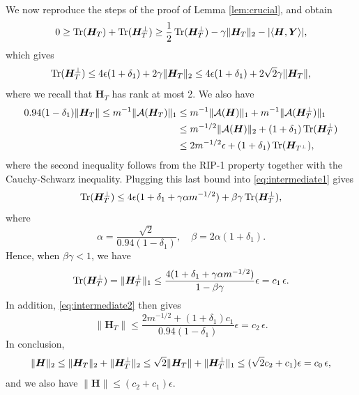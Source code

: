 \documentclass[11pt]{article}
\newcommand{\<}{\langle}
\renewcommand{\>}{\rangle}
\newcommand{\bH}{\bm{H}}
\newcommand{\bY}{\bm{Y}}
\newcommand{\tr}{\operatorname{Tr}}
\numberwithin{equation}{section}
\newcommand{\cA}{\mathcal{A}}
\begin{document}
We now reproduce the steps of the proof of Lemma \ref{lem:crucial},
and obtain
\[
0 \ge \tr(\bH_T) + \tr(\bH_\Tp) \ge \frac12 \tr(\bH_\Tp) - \gamma \|\bH_T\|_2
- |\<\bH,\bY\>|, 
\]
which gives 
\begin{equation}
  \label{eq:intermediate1}
  \tr(\bH_\Tp) \le 4\epsilon(1+\delta_1) + 2\gamma \|\bH_T\|_2 \le
4\epsilon(1+\delta_1) + 2\sqrt{2}\gamma \|\bH_T\|, 
\end{equation}
where we recall that $\bH_T$ has rank at most 2. We also have
\begin{align}
\nonumber 0.94(1-\delta_1) \|\bH_T\|  \le m^{-1} \|\cA(\bH_T)\|_1 & \le m^{-1}
\|\cA(\bH)\|_1 + m^{-1} \|\cA(\bH_\Tp)\|_1\\
& \le m^{-1/2}
\|\cA(\bH)\|_2 + (1+\delta_1) \tr(\bH_\Tp)\\
& \le 2m^{-1/2}\epsilon + (1+\delta_1)\tr (\bH_{\Tp}),
\label{eq:intermediate2} 
\end{align}
where the second inequality follows from the RIP-1 property together
with the Cauchy-Schwarz inequality. Plugging this last bound into
\eqref{eq:intermediate1} gives
\[
\tr(\bH_\Tp) \le 4\epsilon (1+\delta_1 + \gamma \alpha m^{-1/2}) + \beta
\gamma \tr(\bH_\Tp),
\]
where 
\[
\alpha = \frac{\sqrt{2}}{0.94(1-\delta_1)}, \quad \beta = 2\alpha (1+\delta_1). 
\]
Hence, when $\beta \gamma < 1$, we have 
\[
\tr(\bH_\Tp) = \|\bH_\Tp\|_1 \le\frac{4(1+\delta_1 + \gamma \alpha
m^{-1/2})}{1-\beta \gamma}\epsilon = c_1 \, \epsilon.
\]
 In addition, \eqref{eq:intermediate2} then gives
\[
\|\bH_T\| \le  \frac{2m^{-1/2}+(1+\delta_1)c_1}{0.94(1-\delta_1)}\epsilon =
c_2 \, \epsilon. 
\]
In conclusion, 
\[ \|\bH\|_2 \le \|\bH_T\|_2 + \|\bH_\Tp\|_2 \le \sqrt{2} \|\bH_T\| +
  \|\bH_\Tp\|_1 \le (\sqrt{2}c_2 + c_1)\epsilon = c_0 \, \epsilon, 
\]
and we also have $\|\bH\| \le (c_2 + c_1) \epsilon$.
\end{document}
